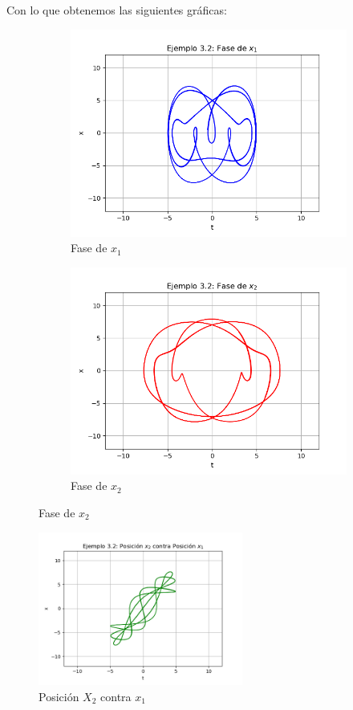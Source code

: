 \documentclass[a4paper]{article}
\begin{document}
\begin{center}
Con lo que obtenemos las siguientes gráficas:
\begin{figure}[ht!]
\begin{subfigure}{0.6\textwidth}
  \centering
  \includegraphics[width=0.75\linewidth]{ejemplo_3_2_2.png}
   \caption{Fase de $x_1$}
\end{subfigure}
\begin{subfigure}{0.6\textwidth}
  \centering
  \includegraphics[width=0.75\linewidth]{ejemplo_3_2_3.png}
  \caption{Fase de $x_2$}
\end{subfigure}
\end{figure}
\begin{figure}[ht!]
 \centering
  \includegraphics[width=0.6\textwidth]{ejemplo_3_2_1.png}
  \caption{Posición $X_2$ contra $x_1$}
\end{figure}


\end{center}
\end{document}
